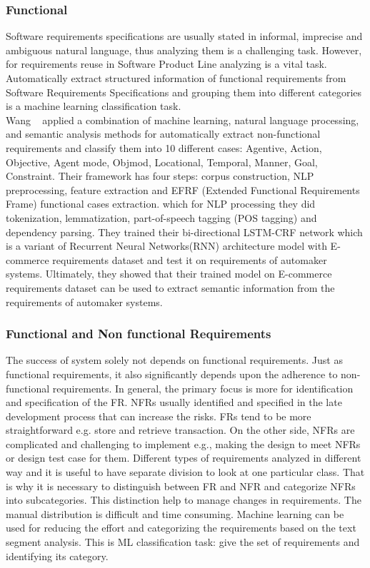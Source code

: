 \subsubsection{Functional}

Software requirements specifications are usually stated in informal, imprecise and ambiguous natural language, thus analyzing them is a challenging task. However, for requirements reuse in Software Product Line analyzing is a vital task. Automatically extract structured information of functional requirements from Software Requirements Specifications and grouping them into different categories is a machine learning classification task\cite{7949577}. \\

Wang \etal~\cite{7949577} applied a combination of machine learning, natural language processing, and semantic analysis methods for automatically extract non-functional requirements and classify them into 10 different cases: Agentive, Action, Objective, Agent mode, Objmod, Locational, Temporal, Manner, Goal, Constraint. Their framework has four steps: corpus construction,  NLP  preprocessing, feature extraction and  EFRF (Extended Functional Requirements Frame) functional cases extraction. which for NLP processing they did tokenization,   lemmatization, part-of-speech tagging (POS  tagging) and dependency parsing. They trained their bi-directional LSTM-CRF network which is a variant of Recurrent Neural Networks(RNN) architecture model with E-commerce requirements dataset and test it on requirements of automaker systems. Ultimately, they showed that their trained model on E-commerce requirements dataset can be used to extract semantic information from the requirements of automaker systems.

\subsubsection{Functional and Non functional Requirements}

The success of system solely not depends on functional requirements. Just as functional requirements, it also significantly depends upon the adherence to non-functional requirements. In general, the primary focus is more for identification and specification of the FR.  NFRs usually identified and specified in the late development process that can increase the risks. FRs tend to be more straightforward e.g. store and retrieve transaction. On the other side, NFRs are complicated and challenging to implement e.g., making the design to meet NFRs or design test case for them. Different types of requirements analyzed in different way and it is useful to have separate division to look at one particular class. That is why it is necessary to distinguish between FR and NFR and categorize NFRs into subcategories. This distinction help to manage changes in requirements. The manual distribution is difficult and time consuming. Machine learning can be used for reducing the effort and categorizing the requirements based on the text segment analysis. This is ML classification task: give the set of requirements and identifying its category. \\

